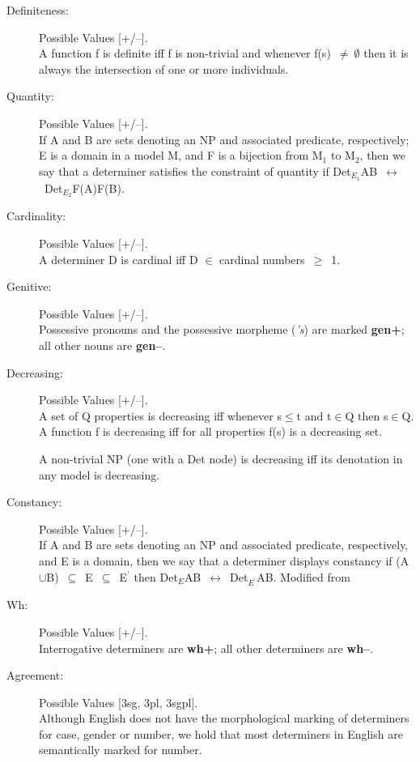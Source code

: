 \begin{description}

\item[Definiteness:] Possible Values [+/--]. \\
A function f is definite iff f is non-trivial and whenever
f(s)~$\neq~\emptyset$ then it is always the intersection of one or
more individuals.  \cite{KeenanStavi86:LP}

\item[Quantity:]  Possible Values [+/--]. \\
If A and B are sets denoting an NP and associated predicate, respectively; E is
a domain in a model M, and F is a bijection from M$_{1}$ to M$_{2}$, then we
say that a determiner satisfies the constraint of quantity if
Det$_{E_{1}}$AB~$\leftrightarrow$~Det$_{E_{2}}$F(A)F(B). \cite{Partee90:BK}

\item[Cardinality:]  Possible Values [+/--]. \\
A determiner D is cardinal iff D $\in$ cardinal numbers~$\geq$~1.

\item[Genitive:]  Possible Values [+/--]. \\
Possessive pronouns and the possessive morpheme ({\it 's}) are marked {\bf
gen+}; all other nouns are {\bf gen--}.

\item[Decreasing:]  Possible Values [+/--]. \\
A set of Q properties is decreasing iff whenever s$\leq$t and t$\in$Q then
s$\in$Q. A function f is decreasing iff for all properties f(s) is a decreasing
set.

A non-trivial NP (one with a Det node) is decreasing iff its denotation in any
model is decreasing. \cite{KeenanStavi86:LP}

\item[Constancy:] Possible Values [+/--]. \\
If A and B are sets denoting an NP and associated predicate, respectively, and
E is a domain, then we say that a determiner displays constancy if
(A$\cup$B)~$\subseteq$~E~$\subseteq$~E$^{\prime}$ then
Det$_{E}$AB~$\leftrightarrow$~Det$_{E^{\prime}}$AB. Modified from
\cite{Partee90:BK}

\item[Wh:]  Possible Values [+/--]. \\
Interrogative determiners are {\bf wh+}; all other determiners are
{\bf wh--}. 

\item[Agreement:] Possible Values [3sg, 3pl, 3sgpl]. \\
Although English does not have the morphological marking of determiners for
case, gender or number, we hold that most determiners in English are
semantically marked for number.

\end{description}

